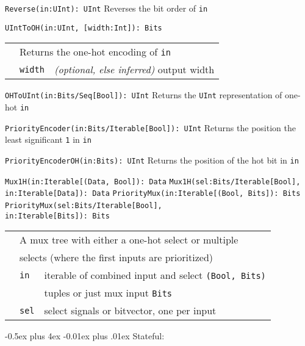 \documentclass[10pt,landscape]{article}
\makeatletter
\renewcommand{\subsection}{\@startsection{subsection}{2}{0mm}%
                                {-0.5ex plus 4ex}%
                                {-0.01ex plus .01ex}%
                                {\normalfont\normalsize\bfseries}}
\makeatother
\begin{document}
\begin{multicols}{3}
\verb$Reverse(in:UInt): UInt$ \newline
\phantom{x} Reverses the bit order of \verb$in$

\verb$UIntToOH(in:UInt, [width:Int]): Bits$ \newline
\begin{tabular}{l l l}
& \multicolumn{2}{l}{Returns the one-hot encoding of \texttt{in}} \\
& \verb$width$ & {\em(optional, else inferred)} output width \\
\end{tabular}

\verb$OHToUInt(in:Bits/Seq[Bool]): UInt$ \newline
\phantom{x} Returns the \verb$UInt$ representation of one-hot \verb$in$

\verb$PriorityEncoder(in:Bits/Iterable[Bool]): UInt$ \newline
\phantom{x} Returns the position the least significant \verb$1$ in \verb$in$

\verb$PriorityEncoderOH(in:Bits): UInt$ \newline
\phantom{x} Returns the position of the hot bit in \verb$in$

\verb$Mux1H(in:Iterable[(Data, Bool]): Data$ \newline
\verb$Mux1H(sel:Bits/Iterable[Bool],$ \newline
\verb$      in:Iterable[Data]): Data$ \newline
\verb$PriorityMux(in:Iterable[(Bool, Bits]): Bits$ \newline
\verb$PriorityMux(sel:Bits/Iterable[Bool],$ \newline
\verb$                  in:Iterable[Bits]): Bits$ \newline
\begin{tabular}{l l l}
& \multicolumn{2}{l}{A mux tree with either a one-hot select or multiple} \\
& \multicolumn{2}{l}{\phantom{x} selects (where the first inputs are prioritized)} \\
& \verb$in$ & iterable of combined input and select \verb$(Bool, Bits)$ \\
& & tuples or just mux input \verb$Bits$ \\
& \verb$sel$ & select signals or bitvector, one per input \\
\end{tabular}

\subsection{Stateful}: \newline


\end{multicols}
\end{document}
